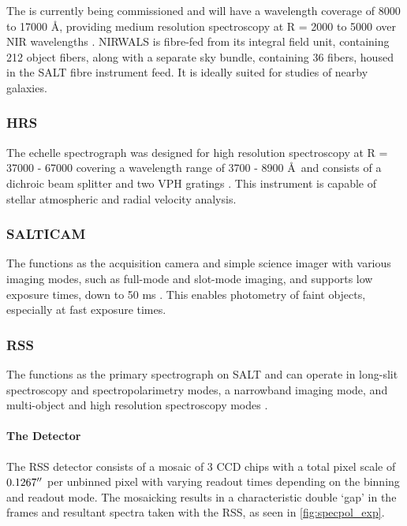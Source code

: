 The  is currently being commissioned and will have a wavelength coverage of 8000 to 17000 \AA, providing medium resolution spectroscopy at R = 2000 to 5000 over \gls{NIR} wavelengths \citep{NIRWALS, SALT_NIRWALS}. \gls{NIRWALS} is fibre-fed from its integral field unit, containing 212 object fibers, along with a separate sky bundle, containing 36 fibers, housed in the \gls{SALT} fibre instrument feed. It is ideally suited for studies of nearby galaxies.

\subsubsection{\gls{HRS}}

The  echelle spectrograph was designed for high resolution spectroscopy at R = 37000 - 67000 covering a wavelength range of 3700 - 8900 \AA\ and consists of a dichroic beam splitter and two \gls{VPH} gratings \citep{SALT_hires}. This instrument is capable of stellar atmospheric and radial velocity analysis.

\subsubsection{\gls{SALTICAM}}

The  functions as the acquisition camera and simple science imager with various imaging modes, such as full-mode and slot-mode imaging, and supports low exposure times, down to 50 ms \citep{SALTICAM}. This enables photometry of faint objects, especially at fast exposure times.

\subsubsection{\gls{RSS}} \label{subsubsec:RSS}

The  functions as the primary spectrograph on \gls{SALT} and can operate in long-slit spectroscopy and spectropolarimetry modes, a narrowband imaging mode, and multi-object and high resolution spectroscopy modes \citep[for an in-depth discussion on operational modes see][or the \href{https://pysalt.salt.ac.za/proposal_calls/current/ProposalCall.html}{latest call for proposals}]{SALT_operational_modes}.

\paragraph{The Detector}
The \gls{RSS} detector consists of a mosaic of 3 \gls{CCD} chips with a total pixel scale of $0.1267\hbox{$^{\prime\prime}$}$ per unbinned pixel with varying readout times depending on the binning and readout mode. The mosaicking results in a characteristic double `gap' in the frames and resultant spectra taken with the \gls{RSS}, as seen in \autoref{fig:specpol_exp}.

